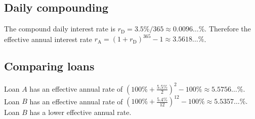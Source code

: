 \documentclass[12pt]{article}
\begin{document}
\subsection{Daily compounding}
The compound daily interest rate is $r_{\mathrm{D}}=3.5\%/365\approx 0.0096\dots\%$. Therefore the effective annual interest rate $r_{\mathrm{A}}=(1+r_{\mathrm{D}})^{365}-1\approx 3.5618\dots\%$.
\subsection{Comparing loans}
Loan $A$ has an effective annual rate of $(100\%+\frac{5.5\%}{2})^{2}-100\%\approx 5.5756\dots\%$. Loan $B$ has an effective annual rate of $(100\%+\frac{5.4\%}{12})^{12}-100\%\approx 5.5357\dots\%.$ Loan $B$ has a lower effective annual rate.
\end{document}
